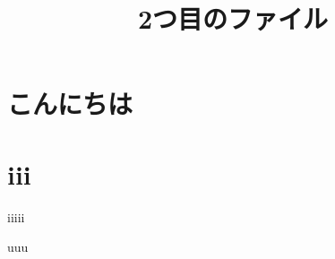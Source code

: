 \documentclass[a4j,epsf,twocolumn]{jarticle}
\title{2つ目のファイル}
\begin{document}
    \section{こんにちは}

    \section{iii}
        iiiii

    \begin{thebibliography}{99}
         uuu
    \end{thebibliography}
\end{document}
